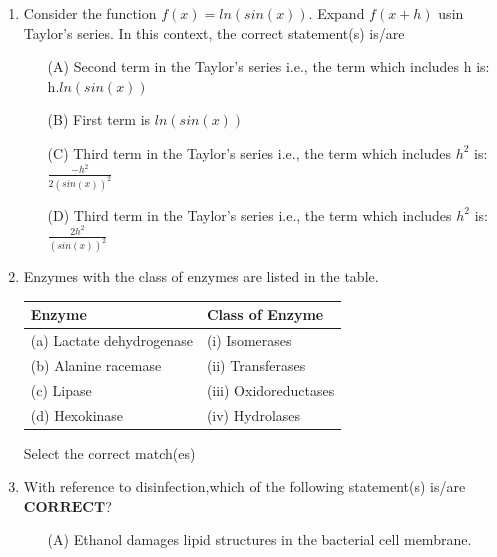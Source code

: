 \documentclass[journal]{IEEEtran}
\numberwithin{equation}{enumi}
\numberwithin{figure}{enumi}
\begin{document}
\begin{enumerate}[start=1, label={Q\arabic*.}]
\item Consider the function $f(x) = ln(sin(x))$.
\vspace{0.1cm}
Expand $f(x + h)$ usin Taylor's series. In this context, the correct statement(s) is/are
 \vspace{0.1cm}
\begin{itemize}
  \item[(A)] Second term in the Taylor's series i.e., the term which includes h is: h.$ln(sin(x))$
  \item[(B)] First term is $ln(sin(x))$
  \item[(C)] Third term in the Taylor's series i.e., the term which includes $h^2$ is: $\frac{-h^2}{2(sin(x))^2}$
  \item[(D)] Third term in the Taylor's series i.e., the term which includes $h^2$ is:$\frac{2h^2}{(sin(x))^2}$
  \end{itemize}
\item Enzymes with the class of enzymes are listed in the table.
\begin{center}
\renewcommand{\arraystretch}{1.1}
\setlength{\tabcolsep}{10pt}
\begin{tabular}{|l|l|}
\hline
\textbf{Enzyme} & \textbf{Class of Enzyme} \\ \hline
(a) Lactate dehydrogenase & (i) Isomerases \\ \hline
(b) Alanine racemase       & (ii) Transferases \\ \hline
(c) Lipase                 & (iii) Oxidoreductases \\ \hline
(d) Hexokinase             & (iv) Hydrolases \\ \hline
\end{tabular}
\end{center}
Select the correct match(es)
 \begin{enumerate}[label=(\Alph*)]
  \end{enumerate}
\item With reference to disinfection,which of the following statement(s) is/are $\mathbf{CORRECT}$?
\begin{itemize}
  \item[(A)] Ethanol damages lipid structures in the bacterial cell membrane.

\end{itemize}
\end{enumerate}
\end{document}
